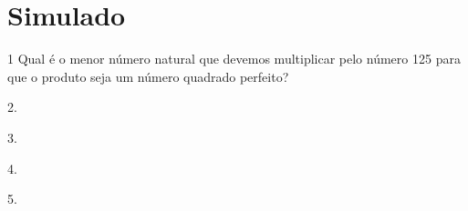 






\mbox{}



\chapter[Simulado 2]{Simulado}

\num{1} Qual é o menor número natural que devemos multiplicar pelo número 125
para que o produto seja um número quadrado perfeito?

\begin{escolha}
\item 2.
\item 3.
\item 4.
\item 5.
\end{escolha}




